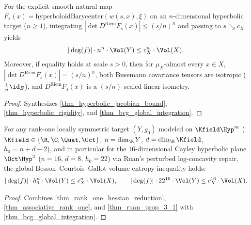 \begin{theorem}
\label{thm_master_hyperbolic_bcg}
\leanok
{}
For the explicit smooth natural map $F_s(x) = \mathrm{hyperboloidBarycenter}(w(s, x), \xi)$ on an $n$-dimensional hyperbolic target ($n \ge 1$), integrating $|\det D^{\mathrm{Riem}} F_s(x)| \le (s/n)^n$ and passing to $s \searrow c_X$ yields
$$|\deg(f)| \cdot n^n \cdot \Vol(Y) \le c_X^n \cdot \Vol(X).$$
Moreover, if equality holds at scale $s > 0$, then for $\mu_X$-almost every $x \in X$, $|\det D^{\mathrm{Riem}} F_s(x)| = (s/n)^n$, both Busemann covariance tensors are isotropic ($\frac{1}{n}\id_E$), and $D^{\mathrm{Riem}} F_s(x)$ is a $(s/n)$-scaled linear isometry.
\end{theorem}
\begin{proof}\leanok Synthesizes \cref{thm_hyperbolic_jacobian_bound}, \cref{thm_hyperbolic_rigidity}, and \cref{thm_bcg_global_integration}.\end{proof}

\begin{theorem}
\label{thm_master_rank_one_bcg}
\leanok
{}
For any rank-one locally symmetric target $(Y, g_0)$ modeled on $\Kfield\Hyp^m$ ($\Kfield \in \{\R, \C, \Quat, \Oct\}$, $n = \dim_\R Y$, $d = \dim_\R \Kfield$, $h_0 = n + d - 2$), and in particular for the $16$-dimensional Cayley hyperbolic plane $\Oct\Hyp^2$ ($n = 16$, $d = 8$, $h_0 = 22$) via Ruan's perturbed log-concavity repair, the global Besson--Courtois--Gallot volume-entropy inequality holds:
$$|\deg(f)| \cdot h_0^n \cdot \Vol(Y) \le c_X^n \cdot \Vol(X), \qquad |\deg(f)| \cdot 22^{16} \cdot \Vol(Y) \le c_X^{16} \cdot \Vol(X).$$
\end{theorem}
\begin{proof}\leanok Combines \cref{thm_rank_one_hessian_reduction}, \cref{thm_associative_rank_one}, and \cref{thm_ruan_prop_3_1} with \cref{thm_bcg_global_integration}.\end{proof}
